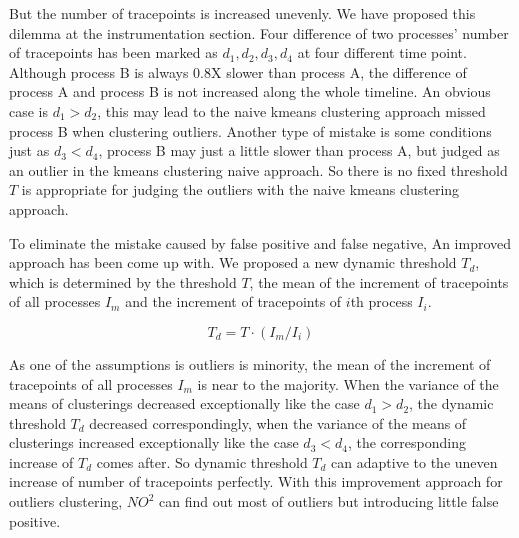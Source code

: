 But the number of tracepoints is increased unevenly. We have proposed this dilemma at the instrumentation section. Four difference of two processes' number of tracepoints has been marked as $d_1, d_2, d_3, d_4$ at four different time point. Although process B is always 0.8X slower than process A, the difference of process A and process B is not increased along the whole timeline. An obvious case is $d_1 > d_2$, this may lead to the naive kmeans clustering approach missed process B when clustering outliers. Another type of mistake is some conditions just as $d_3 < d_4$, process B may just a little slower than process A, but judged as an outlier in the kmeans clustering naive approach. So there is no fixed threshold $T$ is appropriate for judging the outliers with the naive kmeans clustering approach.

To eliminate the mistake caused by false positive and false negative, An improved approach has been come up with. We proposed a new dynamic threshold $T_d$, which is determined by the threshold $T$, the mean of the increment of tracepoints of all processes $I_m$ and the increment of tracepoints of $i$th process $I_i$.

$$T_d = T \cdot (I_m / I_i)$$

As one of the assumptions is outliers is minority, the mean of the increment of tracepoints of all processes $I_m$ is near to the majority. When the variance of the means of clusterings decreased exceptionally like the case $d_1 > d_2$, the dynamic threshold $T_d$ decreased correspondingly, when the variance of the means of clusterings increased exceptionally like the case $d_3 < d_4$, the corresponding increase of $T_d$ comes after. So dynamic threshold $T_d$ can adaptive to the uneven increase of number of tracepoints perfectly. With this improvement approach for outliers clustering, $NO^2$ can find out most of outliers but introducing little false positive. 